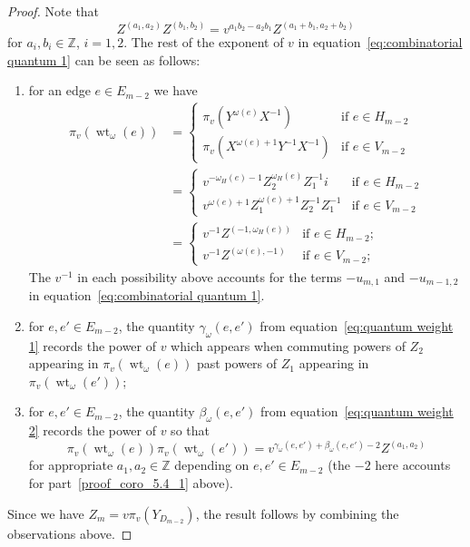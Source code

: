\documentclass[ALCO,ThmDefs,Unicode,epreuves]{cedram}
\newcommand{\ZZ}{\mathbb{Z}}
\DeclareMathOperator{\wt}{wt}
\begin{document}
\begin{proof}
 Note that 
 \begin{equation}
 \label{eq:monomial multiplication}
 Z^{(a_1,a_2)}Z^{(b_1,b_2)}=v^{a_1b_2-a_2b_1}Z^{(a_1+b_1,a_2+b_2)}
 \end{equation}
 for $a_i,b_i\in\ZZ$, $i=1,2$.
 The rest of the exponent of $v$ in equation~\eqref{eq:combinatorial quantum 1} can be seen as follows:
 \begin{enumerate}[label=(\alph*)]
 \item\label{proof_coro_5.4_1} for an edge $e\in E_{m-2}$ we have 
 \begin{align*}
 \pi_v(\wt_\omega(e))
 &=\begin{cases}\pi_v(Y^{\omega(e)}X^{-1}) & \text{if $e\in H_{m-2}$}\\ \pi_v(X^{\omega(e)+1}Y^{-1}X^{-1}) & \text{if $e\in V_{m-2}$} \end{cases}\\
 &=\begin{cases}v^{-\omega_H(e)-1}Z_2^{\omega_H(e)}Z_1^{-1}i & \text{if $e\in H_{m-2}$}\\ v^{\omega(e)+1}Z_1^{\omega(e)+1}Z_2^{-1}Z_1^{-1} & \text{if $e\in V_{m-2}$}\end{cases}\\
 &=\begin{cases}v^{-1}Z^{(-1,\omega_H(e))} & \text{if $e\in H_{m-2}$;}\\ v^{-1}Z^{(\omega(e),-1)} & \text{if $e\in V_{m-2}$;}\end{cases}
 \end{align*}
 The $v^{-1}$ in each possibility above accounts for the terms $-u_{m,1}$ and $-u_{m-1,2}$ in equation~\eqref{eq:combinatorial quantum 1}.
 \item\label{proof_coro_5.4_2} for $e,e'\in E_{m-2}$, the quantity $\gamma_\omega(e,e')$ from equation~\eqref{eq:quantum weight 1} records the power of $v$ which appears when commuting powers of $Z_2$ appearing in $\pi_v(\wt_\omega(e))$ past powers of $Z_1$ appearing in $\pi_v(\wt_\omega(e'))$;
 \item\label{proof_coro_5.4_3} for $e,e'\in E_{m-2}$, the quantity $\beta_\omega(e,e')$ from equation~\eqref{eq:quantum weight 2} records the power of $v$ so that 
 \[\pi_v(\wt_\omega(e))\pi_v(\wt_\omega(e'))=v^{\gamma_\omega(e,e')+\beta_\omega(e,e')-2}Z^{(a_1,a_2)}\]
 for appropriate $a_1,a_2\in\ZZ$ depending on $e,e'\in E_{m-2}$ (the $-2$ here accounts for part~\ref{proof_coro_5.4_1} above).
 \end{enumerate}
 Since we have $Z_m=v\pi_v(Y_{D_{m-2}})$, the result follows by combining the observations above.
\end{proof}
\end{document}
